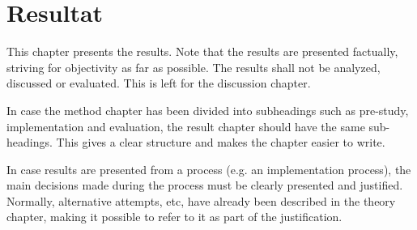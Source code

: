 
\chapter{Resultat}
\label{cha:results}

This chapter presents the results. Note that the results are presented
factually, striving for objectivity as far as possible.  The results
shall not be analyzed, discussed or evaluated.  This is left for the
discussion chapter.

In case the method chapter has been divided into subheadings such as
pre-study, implementation and evaluation, the result chapter should
have the same sub-headings. This gives a clear structure and makes the
chapter easier to write.

In case results are presented from a process (e.g. an implementation
process), the main decisions made during the process must be clearly
presented and justified. Normally, alternative attempts, etc, have
already been described in the theory chapter, making it possible to
refer to it as part of the justification.


